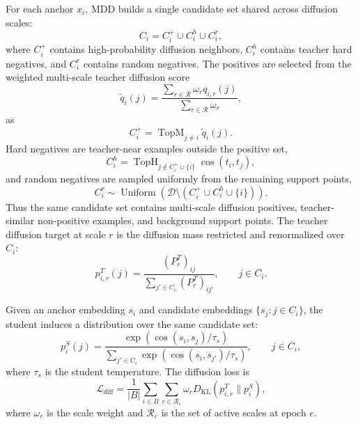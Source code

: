 For each anchor $x_i$, MDD builds a single candidate set shared across diffusion scales:
\begin{equation}
    C_i = C_i^{+} \cup C_i^{h} \cup C_i^{r},
\end{equation}
where $C_i^{+}$ contains high-probability diffusion neighbors, $C_i^{h}$ contains teacher hard negatives, and $C_i^{r}$ contains random negatives. The positives are selected from the weighted multi-scale teacher diffusion score
\begin{equation}
    \tilde q_i(j)
    =
    \frac{\sum_{r\in\mathcal{R}}\omega_r q_{i,r}(j)}
    {\sum_{r\in\mathcal{R}}\omega_r},
\end{equation}
as
\begin{equation}
    C_i^{+}
    =
    \operatorname{TopM}_{j\neq i}\tilde q_i(j).
\end{equation}
Hard negatives are teacher-near examples outside the positive set,
\begin{equation}
    C_i^{h}
    =
    \operatorname{TopH}_{j\notin C_i^{+}\cup\{i\}}
    \cos(t_i,t_j),
\end{equation}
and random negatives are sampled uniformly from the remaining support points,
\begin{equation}
    C_i^{r}
    \sim
    \operatorname{Uniform}
    \left(
    \mathcal{D}\setminus(C_i^{+}\cup C_i^{h}\cup\{i\})
    \right).
\end{equation}
Thus the same candidate set contains multi-scale diffusion positives, teacher-similar non-positive examples, and background support points. The teacher diffusion target at scale $r$ is the diffusion mass restricted and renormalized over $C_i$:
\begin{equation}
    p_{i,r}^{T}(j)
    =
    \frac{(P_r^T)_{ij}}
    {\sum_{j' \in C_i}(P_r^T)_{ij'}},
    \qquad j\in C_i.
\end{equation}

Given an anchor embedding $s_i$ and candidate embeddings $\{s_j:j\in C_i\}$, the student induces a distribution over the same candidate set:
\begin{equation}
    p_i^{S}(j)
    =
    \frac{\exp(\cos(s_i,s_j)/\tau_s)}
    {\sum_{j'\in C_i}\exp(\cos(s_i,s_{j'})/\tau_s)},
    \qquad j\in C_i,
\end{equation}
where $\tau_s$ is the student temperature. The diffusion loss is
\begin{equation}
    \mathcal{L}_{\mathrm{diff}}
    =
    \frac{1}{|B|}
    \sum_{i\in B}
    \sum_{r\in\mathcal{R}_{e}}
    \omega_r
    D_{\mathrm{KL}}
    \left(
        p_{i,r}^{T} \| p_i^{S}
    \right),
\end{equation}
where $\omega_r$ is the scale weight and $\mathcal{R}_{e}$ is the set of active scales at epoch $e$.


